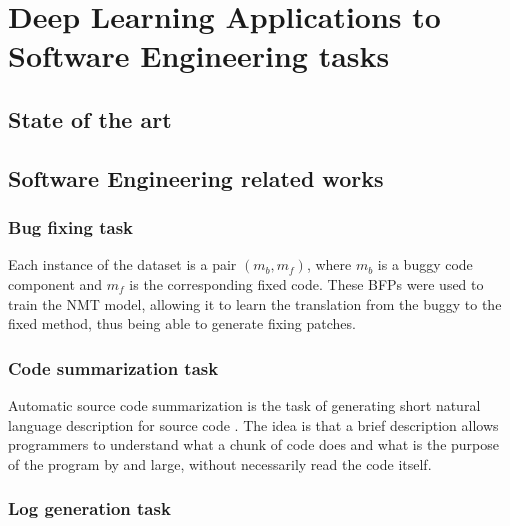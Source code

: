 \chapter{Deep Learning Applications to Software Engineering tasks}

\section{State of the art}
\section{Software Engineering related works}
\subsection{Bug fixing task}
Each instance of the dataset is a pair $(m_b, m_f)$, where $m_b$ is a buggy code component and $m_f$ is the
corresponding fixed code. These BFPs were used to train the NMT model, allowing it to learn the translation
from the buggy to the fixed method, thus being able to generate fixing patches.
\subsection{Code summarization task}
Automatic source code summarization is the task of generating short natural language description 
for source code \cite{Leclair2020}. The idea is that a brief description allows programmers to understand
what a chunk of code does and what is the purpose of the program by and large, without necessarily read the code 
itself.\\
\subsection{Log generation task}
\section{}